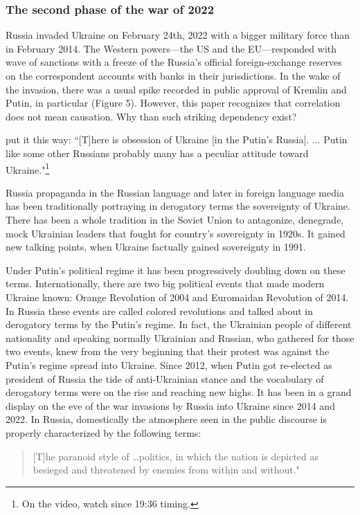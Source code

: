 \subsubsection{The second phase of the war of 2022}

Russia invaded Ukraine on February 24th, 2022 with a bigger military
force than in February 2014. The Western powers---the US and the
EU---responded with wave of sanctions with a freeze of the Russia's
official foreign-exchange reserves on the correspondent accounts with
banks in their jurisdictions. In the wake of the invasion, there was a
usual spike recorded in public approval of Kremlin and Putin, in
particular (Figure 5). However, this paper recognizes that correlation
does not mean causation. Why than such striking dependency exist?

\cite{dibb2022} put it this way: ``[T]here is obsession of Ukraine [in the
Putin's Russia]. ... Putin like some other Russians probably many has a
peculiar attitude toward Ukraine."\footnote{On the video, watch since 19:36 timing.}

Russia propaganda in the Russian language and later in foreign language
media has been traditionally portraying in derogatory terms the
sovereignty of Ukraine. There has been a whole tradition in the Soviet
Union to antagonize, denegrade, mock Ukrainian leaders that fought for
country's sovereignty in 1920s. It gained new talking points, when
Ukraine factually gained sovereignty in 1991.

Under Putin's political regime it has been progressively doubling down
on these terms. Internationally, there are two big political events that
made modern Ukraine known: Orange Revolution of 2004 and Euromaidan
Revolution of 2014. In Russia these events are called colored
revolutions and talked about in derogatory terms by the Putin's regime.
In fact, the Ukrainian people of different nationality and speaking
normally Ukrainian and Russian, who gathered for those two events, knew
from the very beginning that their protest was against the Putin's
regime spread into Ukraine. Since 2012, when Putin got re-elected as
president of Russia the tide of anti-Ukrainian stance and the vocabulary
of derogatory terms were on the rise and reaching new highs. It has been
in a grand display on the eve of the war invasions by Russia into
Ukraine since 2014 and 2022. In Russia, domestically the atmosphere seen
in the public discourse is properly characterized by the following
terms:

\begin{quote}
[T]he paranoid style of \dots politics, in which the nation is
depicted as besieged and threatened by enemies from within and
without."~\citep[pp.~82-83]{dharvey}
\end{quote}

